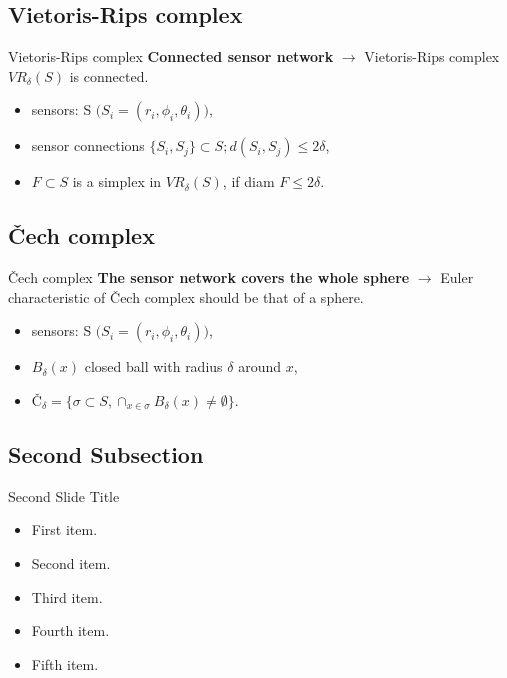 \documentclass{beamer}
\begin{document}
\subsection{Vietoris-Rips complex}

\begin{frame}{Vietoris-Rips complex}{}
\textbf{Connected sensor network} $\longrightarrow$ Vietoris-Rips complex $VR_\delta(S)$ is connected.
  \begin{itemize}
  	\item {sensors: S $\big(S_i = (r_i, \phi_i, \theta_i)\big)$,}
  	\item {sensor connections $\{S_i, S_j\} \subset S; d(S_i, S_j) \leq 2\delta$,}
  	\item {$F \subset S$ is a simplex in $VR_\delta(S)$, if diam $F \leq 2\delta$}.
  \end{itemize}
\end{frame}
\subsection{Čech complex}

\begin{frame}{Čech complex}{}
\textbf{The sensor network covers the whole sphere} $\longrightarrow$ Euler characteristic of Čech complex should be that of a sphere.
\begin{itemize}
	\item {sensors: S $\big(S_i = (r_i, \phi_i, \theta_i)\big)$,}
	\item {$B_\delta(x)$ closed ball with radius $\delta$ around $x$,}
	\item {$Č_\delta = \{\sigma \subset S,\cap_{x\in \sigma}B_\delta(x) \neq \emptyset \}$}.
\end{itemize}
\end{frame}
\subsection{Second Subsection}

\begin{frame}{Second Slide Title}
  \begin{itemize}
  \item {
    First item.
    \pause %
  }
  \item {   
    Second item.
  }
  \item<3-> {
    Third item.
  }
  \item<4-> {
    Fourth item.
  }
  \item<5-> {
    Fifth item. 
  }
  \end{itemize}
\end{frame}
\end{document}
